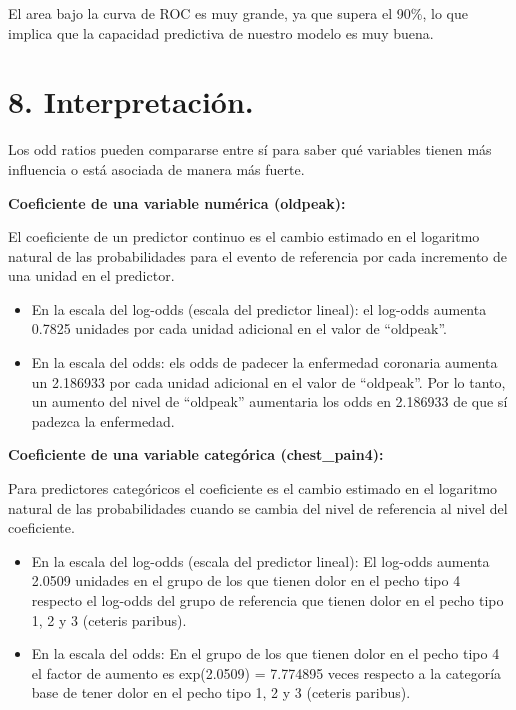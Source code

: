 \documentclass[]{article}
\begin{document}
El area bajo la curva de ROC es muy grande, ya que supera el 90\%, lo
que implica que la capacidad predictiva de nuestro modelo es muy buena.

\section{8. Interpretación.}\label{interpretacion.}

Los odd ratios pueden compararse entre sí para saber qué variables
tienen más influencia o está asociada de manera más fuerte.

\textbf{Coeficiente de una variable numérica (oldpeak):}

El coeficiente de un predictor continuo es el cambio estimado en el
logaritmo natural de las probabilidades para el evento de referencia por
cada incremento de una unidad en el predictor.

\begin{itemize}
\item
  En la escala del log-odds (escala del predictor lineal): el log-odds
  aumenta 0.7825 unidades por cada unidad adicional en el valor de
  ``oldpeak''.
\item
  En la escala del odds: els odds de padecer la enfermedad coronaria
  aumenta un 2.186933 por cada unidad adicional en el valor de
  ``oldpeak''. Por lo tanto, un aumento del nivel de ``oldpeak''
  aumentaria los odds en 2.186933 de que sí padezca la enfermedad.
\end{itemize}

\textbf{Coeficiente de una variable categórica (chest\_pain4):}

Para predictores categóricos el coeficiente es el cambio estimado en el
logaritmo natural de las probabilidades cuando se cambia del nivel de
referencia al nivel del coeficiente.

\begin{itemize}
\item
  En la escala del log-odds (escala del predictor lineal): El log-odds
  aumenta 2.0509 unidades en el grupo de los que tienen dolor en el
  pecho tipo 4 respecto el log-odds del grupo de referencia que tienen
  dolor en el pecho tipo 1, 2 y 3 (ceteris paribus).
\item
  En la escala del odds: En el grupo de los que tienen dolor en el pecho
  tipo 4 el factor de aumento es exp(2.0509) = 7.774895 veces respecto a
  la categoría base de tener dolor en el pecho tipo 1, 2 y 3 (ceteris
  paribus).
\end{itemize}
\end{document}

